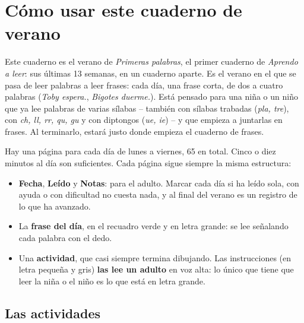 \section*{Cómo usar este cuaderno de verano}

Este cuaderno es el verano de \emph{Primeras palabras}, el primer
cuaderno de \emph{Aprendo a leer}: sus últimas 13 semanas, en un
cuaderno aparte. Es el verano en el que se pasa de leer palabras a leer
frases: cada día, una frase corta, de dos a cuatro palabras
(\emph{Toby espera.}, \emph{Bigotes duerme.}). Está pensado para una
niña o un niño que ya lee palabras de varias sílabas -- también con
sílabas trabadas (\emph{pla, tre}), con \emph{ch, ll, rr, qu, gu} y con
diptongos (\emph{ue, ie}) -- y que empieza a juntarlas en frases. Al
terminarlo, estará justo donde empieza el cuaderno de frases.

Hay una página para cada día de lunes a viernes, 65 en total. Cinco o
diez minutos al día son suficientes. Cada página sigue siempre la misma
estructura:

\begin{itemize}[leftmargin=6mm]
\item \textbf{Fecha}, \textbf{Leído} y \textbf{Notas}: para el adulto.
  Marcar cada día si ha leído sola, con ayuda o con dificultad no
  cuesta nada, y al final del verano es un registro de lo que ha
  avanzado.
\item La \textbf{frase del día}, en el recuadro verde y en letra
  grande: se lee señalando cada palabra con el dedo.
\item Una \textbf{actividad}, que casi siempre termina dibujando. Las
  instrucciones (en letra pequeña y gris) \textbf{las lee un adulto} en
  voz alta: lo único que tiene que leer la niña o el niño es lo que
  está en letra grande.
\end{itemize}

\subsection*{Las actividades}

